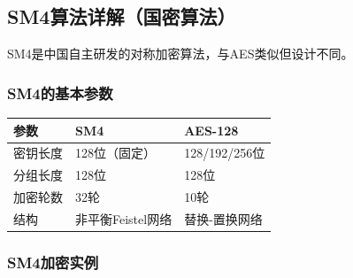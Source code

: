 \documentclass[12pt,a4paper]{article}
\begin{document}
\subsection{SM4算法详解（国密算法）}

SM4是中国自主研发的对称加密算法，与AES类似但设计不同。

\subsubsection{SM4的基本参数}

\begin{center}
\begin{tabular}{|l|l|l|}
\hline
\textbf{参数} & \textbf{SM4} & \textbf{AES-128} \\
\hline
密钥长度 & 128位（固定） & 128/192/256位 \\
\hline
分组长度 & 128位 & 128位 \\
\hline
加密轮数 & 32轮 & 10轮 \\
\hline
结构 & 非平衡Feistel网络 & 替换-置换网络 \\
\hline
\end{tabular}
\end{center}

\subsubsection{SM4加密实例}
\end{document}
